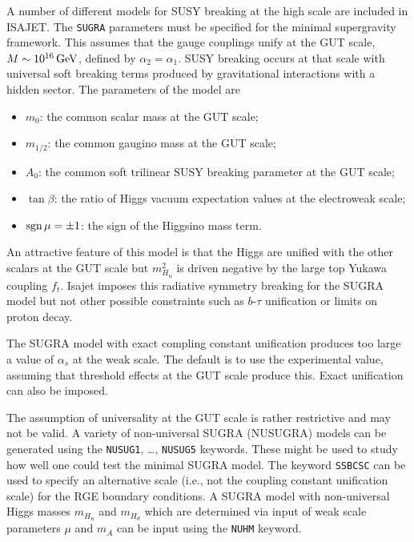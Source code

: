 \medskip

      A number of different models for SUSY breaking at the high scale
are included in ISAJET. The \verb|SUGRA| parameters must be
specified for the
minimal supergravity framework. This assumes that the gauge couplings
unify at the GUT scale, $M \sim 10^{16}\,{\rm GeV}$, defined by
$\alpha_2=\alpha_1$. SUSY breaking occurs at that scale with universal
soft breaking terms produced by gravitational interactions with a hidden
sector. The parameters of the model are
\begin{itemize}
\item $m_0$: the common scalar mass at the GUT scale;
\item $m_{1/2}$: the common gaugino mass at the GUT scale;
\item $A_0$: the common soft trilinear SUSY breaking parameter at the
GUT scale;
\item $\tan\beta$: the ratio of Higgs vacuum expectation values at the
electroweak scale;
\item $\mathop{\rm sgn}\mu=\pm1$: the sign of the Higgsino mass term.
\end{itemize}
An attractive feature of this model is that the Higgs are unified with
the other scalars at the GUT scale but $m_{H_u}^2$ is driven negative by
the large top Yukawa coupling $f_t$. Isajet imposes this radiative
symmetry breaking for the SUGRA model but not other possible constraints
such as $b$-$\tau$ unification or limits on proton decay.

      The SUGRA model with exact compling constant unification produces
too large a value of $\alpha_s$ at the weak scale. The default is to use
the experimental value, assuming that threshold effects at the GUT scale
produce this. Exact unification can also be imposed.

      The assumption of universality at the GUT scale is rather
restrictive and may not be valid. A variety of non-universal SUGRA
(NUSUGRA) models can be generated using the \verb|NUSUG1|, \dots,
\verb|NUSUG5| keywords. These might be used to study how well one could
test the minimal SUGRA model. The keyword \verb|SSBCSC| can be used to
specify an alternative scale (i.e., not the coupling constant
unification scale) for the RGE boundary conditions.
A SUGRA model with non-universal Higgs masses $m_{H_u}$ and $m_{H_d}$
which are determined via input of weak scale parameters $\mu$
and $m_A$ can be input using the \verb|NUHM| keyword.

\medskip

